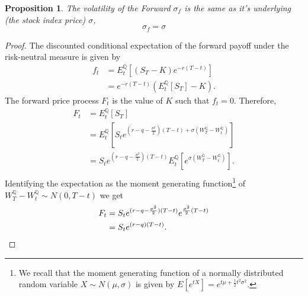 \documentclass{article}
\newtheorem{prop}[thm]{Proposition}
\theoremstyle{definition}
\theoremstyle{remark}
\newcommand{\measure}[1]{\ensuremath{\mathbb{#1}}}
\begin{document}
\begin{prop}\label{prop:riskn2}
The volatility of the Forward $\sigma_f$ is the same as it's underlying (the stock index price) $\sigma$,
\begin{equation}
	\boxed{\sigma_f = \sigma}
\end{equation}
\end{prop}
\begin{proof}
The discounted conditional expectation of the forward payoff under the risk-neutral measure is given by
\begin{align*}
f_t&=E^\measure{Q}_t[(S_T-K)e^{-r(T-t)}]\\
&=e^{-r(T-t)}(E^\measure{Q}_t[S_T]-K).
\end{align*}
The forward price process $F_t$ is the value of $K$ such that $f_t=0$. Therefore,
\begin{align*}
F_t&=E^\measure{Q}_t[S_T]\\
&=E^\measure{Q}_t[S_te^{(r-q-\frac{\sigma^2}{2})(T-t)+\sigma(W_T^\measure{Q}-W_t^\measure{Q})}]\\
&=S_te^{(r-q-\frac{\sigma^2}{2})(T-t)}E^\measure{Q}_t[e^{\sigma(W_T^\measure{Q}-W_t^\measure{Q})}].\\
\end{align*}
Identifying the expectation as the moment generating function\footnote{We recall that the moment generating function of a normally distributed random variable $X\sim N(\mu, \sigma)$ is given by $E[e^{tX}]=e^{t\mu+\frac{1}{2}t^2\sigma^2}$.} of $W_T^\measure{Q}-W_t^\measure{Q}\sim N(0, T-t)$ we get 
\begin{align}
F_t&=S_te^{(r-q-\frac{\sigma^2}{2})(T-t)}e^{\frac{\sigma^2}{2}(T-t)}\notag\\
&=S_te^{(r-q)(T-t)}.\label{eq:fwd}
\end{align}



\end{proof}
\end{document}
